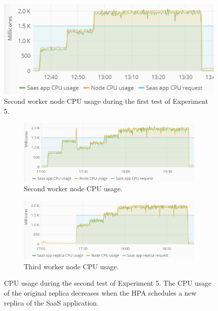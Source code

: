 \begin{figure}
\centering
\includegraphics[width=0.70\columnwidth]{Images/Experiments/CPU/Grafana/cpu-saas-li.PNG}
\caption{Second worker node CPU usage during the first test of Experiment 5.}
\label{fig:cpu-saas-li}
\end{figure}

%


\begin{figure}
\centering
\begin{subfigure}[b]{\columnwidth}
\centering
\includegraphics[width=0.70\columnwidth]{Images/Experiments/CPU/Grafana/cpu-saas-hpa-li-1.PNG}
\caption{Second worker node CPU usage.}
\label{fig:cpu-saas-hpa-li-1}
\end{subfigure}
\hfill
\begin{subfigure}[b]{\columnwidth}
\centering
\includegraphics[width=0.70\columnwidth]{Images/Experiments/CPU/Grafana/cpu-saas-hpa-li-2.PNG}
\caption{Third worker node CPU usage.}
\label{fig:cpu-saas-hpa-li-2}
\end{subfigure}
\hfill
\vspace*{-7mm}
\caption{CPU usage during the second test of Experiment 5. The CPU usage of the original replica decreases when the HPA schedules a new replica of the SaaS application.}
\label{fig:cpu-cas-hpa-li-2}
\end{figure}

